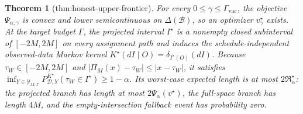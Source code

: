 \documentclass{article}
\newtheorem{theorem}{Theorem}
\begin{document}
\begin{theorem}[thm:honest-upper-frontier]\label{thm:honest-upper-frontier}
For every \(0\le\gamma\le\Gamma_{\mathrm{vac}}\), the objective \(\Psi_{\alpha,\gamma}\) is convex and lower semicontinuous on \(\Delta(\mathcal B)\), so an optimizer \(v_\gamma^\star\) exists. At the target budget \(\Gamma\), the projected interval \(I^\star\) is a nonempty closed subinterval of \([-2M,2M]\) on every assignment path and induces the schedule-independent observed-data Markov kernel \(K^\star(dI\mid O)=\delta_{I^\star(O)}(dI)\). Because \(\tau_W\in[-2M,2M]\) and \(\lvert\Pi_M(x)-\tau_W\rvert\le\lvert x-\tau_W\rvert\), it satisfies \(\inf_{Y\in\mathcal Y_{M,\Gamma}}P^{K^\star}_{\mathcal D,Y}(\tau_W\in I^\star)\ge1-\alpha\). Its worst-case expected length is at most \(2\mathfrak R_\alpha^\star\): the projected branch has length at most \(2\Psi_\alpha(v^\star)\), the full-space branch has length \(4M\), and the empty-intersection fallback event has probability zero.
\end{theorem}
\end{document}
